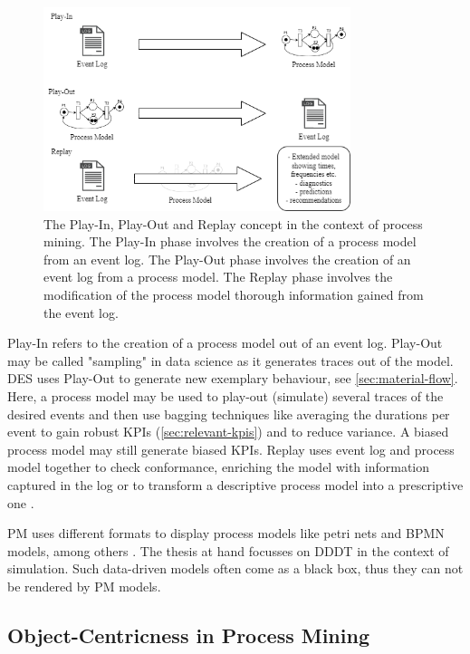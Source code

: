\begin{figure}[htbp]
  \centering
  \includegraphics[width=0.8\textwidth]{figures/playinplayoutreplay.png}
  \caption{The Play-In, Play-Out and Replay concept in the context of process mining. The Play-In phase involves the creation of a process model from an event log. The Play-Out phase involves the creation of an event log from a process model. The Replay phase involves the modification of the process model thorough information gained from the event log.}
  \label{fig:playinoutreplay}
\end{figure}

Play-In refers to the creation of a process model out of an event log. Play-Out may be called "sampling" in data science as it generates traces out of the model. DES uses Play-Out to generate new exemplary behaviour, see \autoref{sec:material-flow}. Here, a process model may be used to play-out (simulate) several traces of the desired events and then use bagging techniques like averaging the durations per event to gain robust KPIs (\autoref{sec:relevant-kpis}) and to reduce variance. A biased process model may still generate biased KPIs. Replay uses event log and process model together to check conformance, enriching the model with information captured in the log or to transform a descriptive process model into a prescriptive one \parencite{van2016data}.

PM uses different formats to display process models like petri nets and BPMN models, among others \parencite{vanderAalst2012}. The thesis at hand focusses on DDDT in the context of simulation. Such data-driven models often come as a black box, thus they can not be rendered by PM models.


\subsection{Object-Centricness in Process Mining}
\label{sec:object-centric-event-logs}

